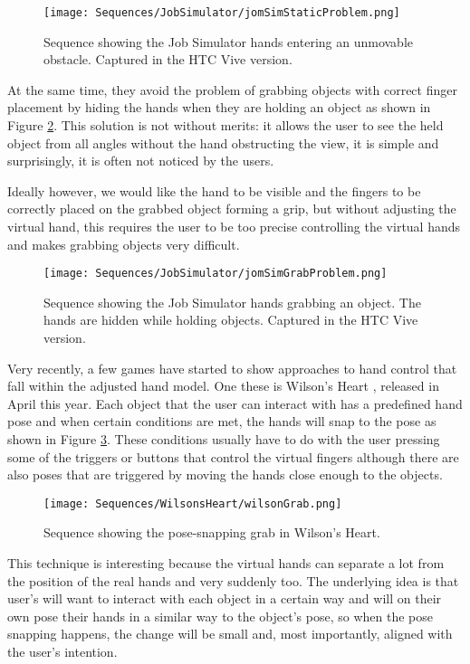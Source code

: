 \begin{figure}[H]
\centering
\texttt{[image: Sequences/JobSimulator/jomSimStaticProblem.png]}
\caption{Sequence showing the Job Simulator hands entering an unmovable obstacle. Captured in the HTC Vive version.}
\label{fig:jobSimStaticProblem}
\end{figure}

At the same time, they avoid the problem of grabbing objects with correct finger placement by hiding the hands when they are holding an object as shown in Figure \ref{fig:jobSimGrabProblem}. This solution is not without merits: it allows the user to see the held object from all angles without the hand obstructing the view, it is simple and surprisingly, it is often not noticed by the users.

Ideally however, we would like the hand to be visible and the fingers to be correctly placed on the grabbed object forming a grip, but without adjusting the virtual hand, this requires the user to be too precise controlling the virtual hands and makes grabbing objects very difficult.

\begin{figure}[H]
\centering
\texttt{[image: Sequences/JobSimulator/jomSimGrabProblem.png]}
\caption{Sequence showing the Job Simulator hands grabbing an object. The hands are hidden while holding objects. Captured in the HTC Vive version.}
\label{fig:jobSimGrabProblem}
\end{figure}

Very recently, a few games have started to show approaches to hand control that fall within the adjusted hand model. One these is Wilson's Heart \parencite{TwistedPixelGames2017}, released in April this year. Each object that the user can interact with has a predefined hand pose and when certain conditions are met, the hands will snap to the pose as shown in Figure \ref{fig:wilsonGrab}. These conditions usually have to do with the user pressing some of the triggers or buttons that control the virtual fingers although there are also poses that are triggered by moving the hands close enough to the objects.

\begin{figure}[H]
\centering
\texttt{[image: Sequences/WilsonsHeart/wilsonGrab.png]}
\caption{Sequence showing the pose-snapping grab in Wilson's Heart.}
\label{fig:wilsonGrab}
\end{figure}

This technique is interesting because the virtual hands can separate a lot from the position of the real hands and very suddenly too. The underlying idea is that user's will want to interact with each object in a certain way and will on their own pose their hands in a similar way to the object's pose, so when the pose snapping happens, the change will be small and, most importantly, aligned with the user's intention. 


